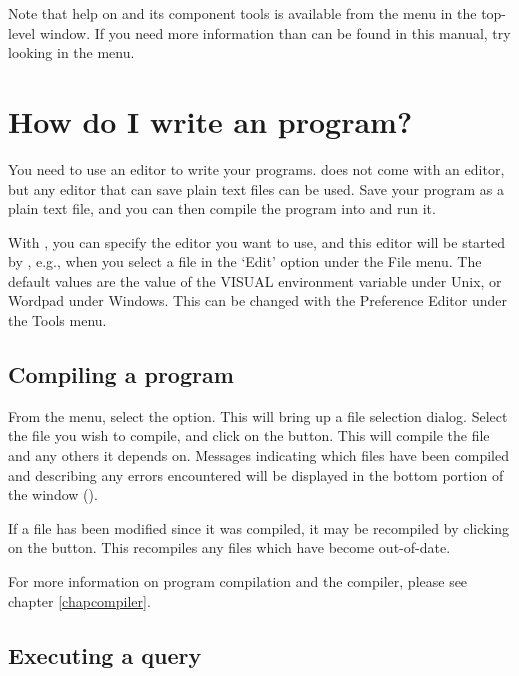 Note that help on {\tkeclipse} and its component tools is available from the
 menu in the top-level window.
If you need more information than can be found in this manual, try looking
in the  menu.

\section{How do I write an {\eclipse} program?}
You need to use an editor to write your programs. {\eclipse} does not come
with an editor, but any editor that can save plain text files can be used.
Save your program as a plain text file, and you can then compile the
program into {\eclipse} and run it.

With {\tkeclipse}, you can specify the editor you want to use, and this
editor will be started by {\tkeclipse}, e.g., when you select a file in
the `Edit' option under the File menu. The default values are the value of
the VISUAL environment variable  under Unix, or Wordpad under Windows.
This can be changed with the Preference Editor under the Tools menu.

\subsection{Compiling a program}

From the  menu, select the  option.
This will bring up a file selection dialog.
Select the file you wish to compile, and click on the  button.
This will compile the file and any others it depends on.
Messages indicating which files have been compiled and describing any errors
encountered will be displayed in the bottom portion of the {\tkeclipse}
window ().

If a file has been modified since it was compiled,
it may be recompiled by clicking on the  button.
This recompiles any files which have become out-of-date.

For more information on program compilation and the compiler, please see
chapter \ref{chapcompiler}.

\subsection{Executing a query}

